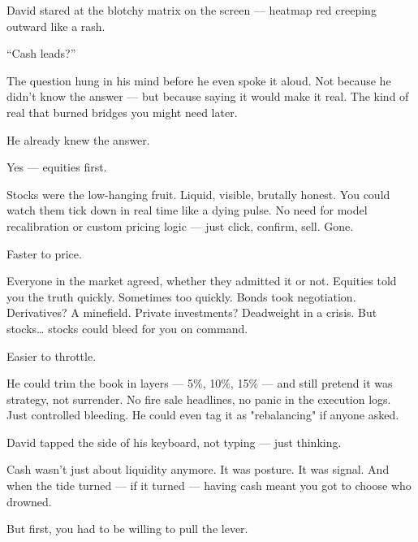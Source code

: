 \medskip


David stared at the blotchy matrix on the screen — heatmap red creeping outward like a rash.

“Cash leads?”

The question hung in his mind before he even spoke it aloud. Not because he didn’t know the answer — but because saying it would make it real. The kind of real that burned bridges you might need later.

He already knew the answer.

Yes — equities first.

Stocks were the low-hanging fruit. Liquid, visible, brutally honest. You could watch them tick down in real time like a dying pulse. No need for model recalibration or custom pricing logic — just click, confirm, sell. Gone.

Faster to price.

Everyone in the market agreed, whether they admitted it or not. Equities told you the truth quickly. Sometimes too quickly. Bonds took negotiation. Derivatives? A minefield. Private investments? Deadweight in a crisis. But stocks… stocks could bleed for you on command.

Easier to throttle.

He could trim the book in layers — 5\%, 10\%, 15\% — and still pretend it was strategy, not surrender. No fire sale headlines, no panic in the execution logs. Just controlled bleeding. He could even tag it as "rebalancing" if anyone asked.

David tapped the side of his keyboard, not typing — just thinking.

Cash wasn’t just about liquidity anymore. It was posture. It was signal. And when the tide turned — if it turned — having cash meant you got to choose who drowned.

But first, you had to be willing to pull the lever.

\medskip

